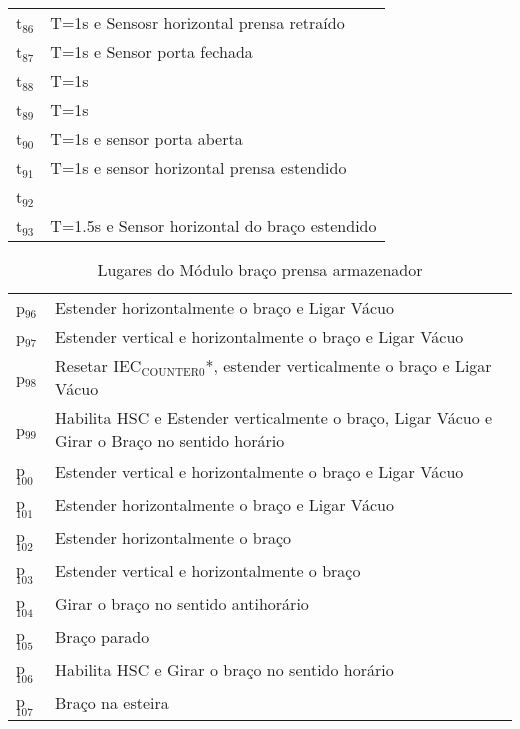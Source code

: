 \begin{center}
\begin{tabular}{ll}
t\(_{\text{86}}\) & T=1s e Sensosr horizontal prensa retraído\\
t\(_{\text{87}}\) & T=1s e Sensor porta fechada\\
t\(_{\text{88}}\) & T=1s\\
t\(_{\text{89}}\) & T=1s\\
t\(_{\text{90}}\) & T=1s e sensor porta aberta\\
t\(_{\text{91}}\) & T=1s e sensor horizontal prensa estendido\\
t\(_{\text{92}}\) & \\
t\(_{\text{93}}\) & T=1.5s e Sensor horizontal do braço estendido\\
\end{tabular}
\end{center}
\begin{table}[htbp]
\caption{Lugares do Módulo braço prensa armazenador}
\centering
\begin{tabular}{ll}
p\(_{\text{96}}\) & Estender horizontalmente o braço e Ligar Vácuo\\
p\(_{\text{97}}\) & Estender vertical e horizontalmente o braço e Ligar Vácuo\\
p\(_{\text{98}}\) & Resetar IEC\(_{\text{COUNTER0}}\)*, estender verticalmente o braço e Ligar Vácuo\\
p\(_{\text{99}}\) & Habilita HSC e Estender verticalmente o braço, Ligar Vácuo e Girar o Braço no sentido horário\\
p\(_{\text{100}}\) & Estender vertical e horizontalmente o braço e Ligar Vácuo\\
p\(_{\text{101}}\) & Estender horizontalmente o braço e Ligar Vácuo\\
p\(_{\text{102}}\) & Estender horizontalmente o braço\\
p\(_{\text{103}}\) & Estender vertical e horizontalmente o braço\\
p\(_{\text{104}}\) & Girar o braço no sentido antihorário\\
p\(_{\text{105}}\) & Braço parado\\
p\(_{\text{106}}\) & Habilita HSC e Girar o braço no sentido horário\\
p\(_{\text{107}}\) & Braço na esteira\\
\end{tabular}
\end{table}

